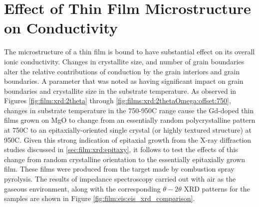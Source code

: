 \vspace{12pt}
\section{Effect of Thin Film Microstructure on Conductivity}
\label{sec:conduction:epitaxy}
The microstructure of a thin film is bound to have substantial effect on its overall ionic conductivity. Changes in crystallite size, and number of grain boundaries alter the relative contributions of conduction by the grain interiors and grain boundaries. A parameter that was noted as having significant impact on grain boundaries and crystallite size in the substrate temperature. As observed in Figures \ref{fig:film:xrd:2theta} through \ref{fig:films:xrd:2thetaOmega:offset:750}, changes in substrate temperature in the 750-950\textdegree C range cause the Gd-doped thin films grown on MgO to change from an essentially random polycrystalline pattern at 750\textdegree C to an epitaxially-oriented single crystal (or highly textured structure) at 950\textdegree C. Given this strong indication of epitaxial growth from the X-ray diffraction studies discussed in \ref{sec:film:xrd:epitaxy}, it follows to test the effects of this change from random crystalline orientation to the essentially epitaxially grown film. These films were produced from the target made by combustion spray pyrolysis. The results of impedance spectroscopy carried out with air as the gaseous environment, along with the corresponding $\theta-2\theta$ XRD patterns for the samples are shown in Figure \ref{fig:film:eis:eis_xrd_comparison}.
